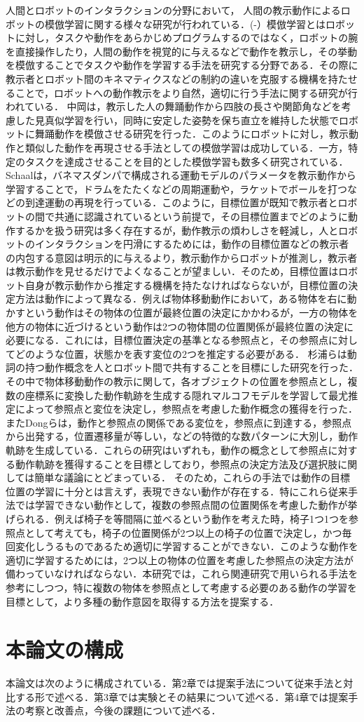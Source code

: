 人間とロボットのインタラクションの分野において，
人間の教示動作によるロボットの模倣学習に関する様々な研究が行われている．(\cite{imitation1}-\cite{imitation4}）模倣学習とはロボットに対し，タスクや動作をあらかじめプログラムするのではなく，ロボットの腕を直接操作したり，人間の動作を視覚的に与えるなどで動作を教示し，その挙動を模倣することでタスクや動作を学習する手法を研究する分野である．その際に教示者とロボット間のキネマティクスなどの制約の違いを克服する機構を持たせることで，ロボットへの動作教示をより自然，適切に行う手法に関する研究が行われている．
中岡\cite{nakaoka}は，教示した人の舞踊動作から四肢の長さや関節角などを考慮した見真似学習を行い，同時に安定した姿勢を保ち直立を維持した状態でロボットに舞踊動作を模倣させる研究を行った．このようにロボットに対し，教示動作と類似した動作を再現させる手法としての模倣学習は成功している．一方，特定のタスクを達成させることを目的とした模倣学習も数多く研究されている．
Schaal\cite{schaal}は，バネマスダンパで構成される運動モデルのパラメータを教示動作から学習することで，ドラムをたたくなどの周期運動や，ラケットでボールを打つなどの到達運動の再現を行っている．このように，目標位置が既知で教示者とロボットの間で共通に認識されているという前提で，その目標位置までどのように動作するかを扱う研究は多く存在するが，動作教示の煩わしさを軽減し，人とロボットのインタラクションを円滑にするためには，動作の目標位置などの教示者の内包する意図は明示的に与えるより，教示動作からロボットが推測し，教示者は教示動作を見せるだけでよくなることが望ましい．そのため，目標位置はロボット自身が教示動作から推定する機構を持たなければならないが，目標位置の決定方法は動作によって異なる．例えば物体移動動作において，ある物体を右に動かすという動作はその物体の位置が最終位置の決定にかかわるが，一方の物体を他方の物体に近づけるという動作は2つの物体間の位置関係が最終位置の決定に必要になる．これには，目標位置決定の基準となる参照点と，その参照点に対してどのような位置，状態かを表す変位の2つを推定する必要がある．
杉浦ら\cite{sugiura}は動詞の持つ動作概念を人とロボット間で共有することを目標にした研究を行った．その中で物体移動動作の教示に関して，各オブジェクトの位置を参照点とし，複数の座標系に変換した動作軌跡を生成する隠れマルコフモデルを学習して最尤推定によって参照点と変位を決定し，参照点を考慮した動作概念の獲得を行った．またDongら\cite{dong}は，動作と参照点の関係である変位を，参照点に到達する，参照点から出発する，位置遷移量が等しい，などの特徴的な数パターンに大別し，動作軌跡を生成している．これらの研究はいずれも，動作の概念として参照点に対する動作軌跡を獲得することを目標としており，参照点の決定方法及び選択肢に関しては簡単な議論にとどまっている．
そのため，これらの手法では動作の目標位置の学習に十分とは言えず，表現できない動作が存在する．特にこれら従来手法では学習できない動作として，複数の参照点間の位置関係を考慮した動作が挙げられる．例えば椅子を等間隔に並べるという動作を考えた時，椅子1つ1つを参照点として考えても，椅子の位置関係が2つ以上の椅子の位置で決定し，かつ毎回変化しうるものであるため適切に学習することができない．このような動作を適切に学習するためには，2つ以上の物体の位置を考慮した参照点の決定方法が備わっていなければならない．本研究では，これら関連研究で用いられる手法を参考にしつつ，特に複数の物体を参照点として考慮する必要のある動作の学習を目標として，より多種の動作意図を取得する方法を提案する．        

\section{本論文の構成}

本論文は次のように構成されている．第2章では提案手法について従来手法と対比する形で述べる．第3章では実験とその結果について述べる．第4章では提案手法の考察と改善点，今後の課題について述べる．	
